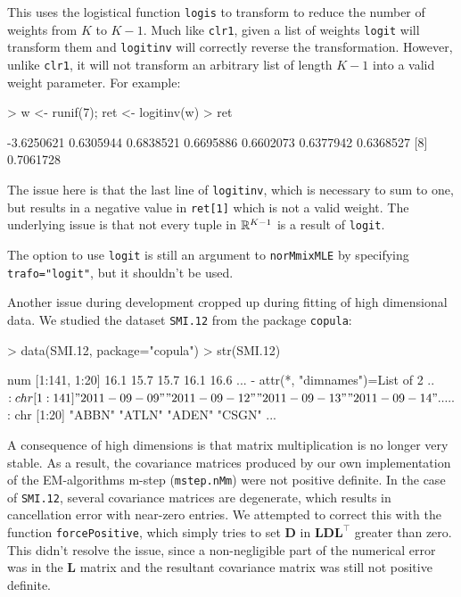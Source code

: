 This uses the logistical function {\tt logis} to transform to reduce the number
of weights from $K$ to $K-1$. Much like {\tt clr1}, given a list of weights 
{\tt logit} will transform them and {\tt logitinv} will correctly reverse the 
transformation. However, unlike {\tt clr1}, it will not transform an arbitrary 
list of length $K-1$ into a valid weight parameter. For example:

\begin{Schunk}
\begin{Sinput}
> w <- runif(7); ret <- logitinv(w)
> ret
\end{Sinput}
\begin{Soutput}
[1] -3.6250621  0.6305944  0.6838521  0.6695886  0.6602073  0.6377942  0.6368527
[8]  0.7061728
\end{Soutput}
\end{Schunk}

The issue here is that the last line of {\tt logitinv}, which is necessary to 
sum to one, but results in a negative value in {\tt ret[1]} which is not a 
valid weight. The underlying issue is that not every tuple in $\mathbb{R}^{K-1}$ is 
a result of {\tt logit}.

The option to use {\tt logit} is still an argument to {\tt norMmixMLE} by 
specifying {\tt trafo="logit"}, but it shouldn't be used.


Another issue during development cropped up during fitting of high dimensional
data. We studied the dataset {\tt SMI.12} from the package {\tt copula}:

\begin{Schunk}
\begin{Sinput}
> data(SMI.12, package="copula")
> str(SMI.12)
\end{Sinput}
\begin{Soutput}
 num [1:141, 1:20] 16.1 15.7 15.7 16.1 16.6 ...
 - attr(*, "dimnames")=List of 2
  ..$ : chr [1:141] "2011-09-09" "2011-09-12" "2011-09-13" "2011-09-14" ...
  ..$ : chr [1:20] "ABBN" "ATLN" "ADEN" "CSGN" ...
\end{Soutput}
\end{Schunk}

A consequence of high dimensions is that matrix multiplication is no longer
very stable. As a result, the covariance matrices produced by our own 
implementation of the EM-algorithms m-step ({\tt mstep.nMm}) were not positive
definite.
In the case of {\tt SMI.12}, several covariance matrices are degenerate, which
results in cancellation error with near-zero entries.
We attempted to correct this with the function {\tt forcePositive}, which 
simply tries to set $\pmb{D}$ in $\pmb{LDL}^\top$ greater than zero.
This didn't resolve the issue, since a non-negligible part of the numerical
error was in the $\pmb{L}$ matrix and the resultant covariance matrix was still
not positive definite.

